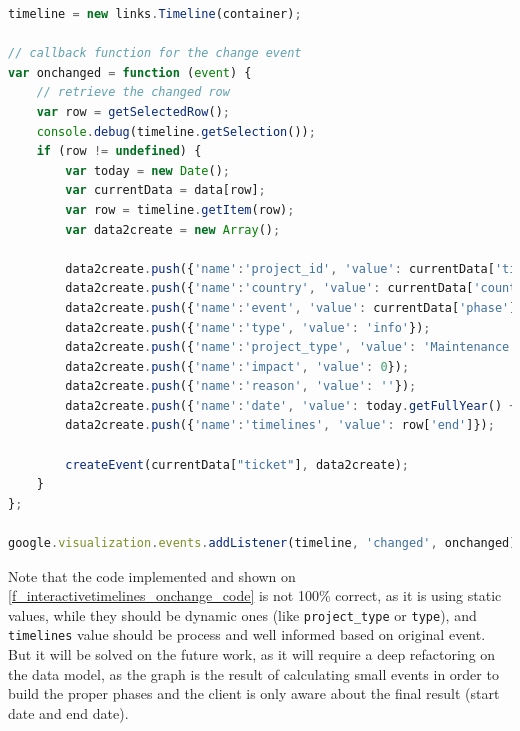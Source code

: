 \begin{lstlisting}[language=Javascript,breaklines=true,caption=CHAP On\
change\ event,label=f_interactivetimelines_onchange_code] 
timeline = new links.Timeline(container);
	
// callback function for the change event
var onchanged = function (event) {
    // retrieve the changed row
    var row = getSelectedRow();
    console.debug(timeline.getSelection());
    if (row != undefined) {
        var today = new Date();
        var currentData = data[row];
        var row = timeline.getItem(row);
        var data2create = new Array();
        
        data2create.push({'name':'project_id', 'value': currentData['ticket']});
        data2create.push({'name':'country', 'value': currentData['country']});
        data2create.push({'name':'event', 'value': currentData['phase']});
        data2create.push({'name':'type', 'value': 'info'});
        data2create.push({'name':'project_type', 'value': 'Maintenance'});
        data2create.push({'name':'impact', 'value': 0});
        data2create.push({'name':'reason', 'value': ''});
        data2create.push({'name':'date', 'value': today.getFullYear() +"-"+ today.getMonth()+1 +"-"+ today.getDate()});
        data2create.push({'name':'timelines', 'value': row['end']});
        
        createEvent(currentData["ticket"], data2create);
    }
};

google.visualization.events.addListener(timeline, 'changed', onchanged);
\end{lstlisting} 

Note that the code implemented and shown on \ref{f_interactivetimelines_onchange_code} is not 100\% correct, as
it is using static values, while they should be dynamic ones (like \texttt{project\_type} or
\texttt{type}), and \texttt{timelines} value should be process and well informed
based on original event. But it will be solved on the future work, as it will
require a deep refactoring on the data model, as the graph is the result of
calculating small events in order to build the proper phases and the client is
only aware about the final result (start date and end date).


% 

